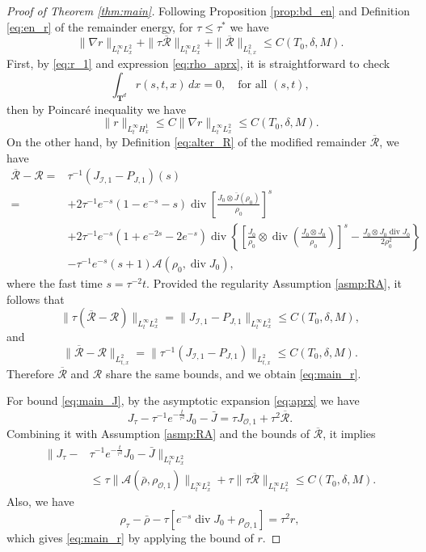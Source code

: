 \documentclass[english]{amsart}
\theoremstyle{plain}
\theoremstyle{definition}
\theoremstyle{remark}
\theoremstyle{plain}
\theoremstyle{plain}
\theoremstyle{plain}
\def\T{{\mathbf T}}%
\DeclareMathOperator{\diver}{div}
\numberwithin{equation}{section}
\begin{document}
\begin{proof}[Proof of Theorem \ref{thm:main}]
Following Proposition \ref{prop:bd_en} and Definition \eqref{eq:en_r} of the remainder energy, for $\tau\leq\tau^*$ we have
\[
\|\nabla r\|_{L^\infty_tL^2_x}+\|\tau\overline{\mathcal{R}}\|_{L^\infty_tL^2_x}+\|\overline{\mathcal{R}}\|_{L^2_{t,x}}\leq C(T_0,\delta,M).
\]
First, by \eqref{eq:r_1} and expression \eqref{eq:rho_aprx}, it is straightforward to check 
\[
\int_{\T^d} r(s,t,x)\,dx=0,\quad\textrm{for all }(s,t),
\]
then by Poincar\'e inequality we have
\[
\|r\|_{L^\infty_tH^1_x}\leq C\|\nabla r\|_{L^\infty_tL^2_x}\leq C(T_0,\delta,M).
\]
On the other hand, by Definition \eqref{eq:alter_R} of the modified remainder $\overline{\mathcal{R}}$, we have
\begin{align*}
\overline{\mathcal{R}}-\mathcal{R}=&\tau^{-1}(J_{\mathcal{I},1}-P_{J,1})(s)\\
=&+2\tau^{-1} e^{-s}(1-e^{-s}-s)\diver\left[\frac{J_0\otimes \bar J(\rho_0)}{\rho_0}\right]^s\\
&+2\tau^{-1} e^{-s}(1+e^{-2s}-2e^{-s})\diver\left\{\left[\frac{J_0}{\rho_0}\otimes\diver\left(\frac{J_0\otimes J_0}{\rho_0}\right)\right]^s-\frac{J_0\otimes J_0\diver J_0}{2\rho_0^2}\right\}\\
&-\tau^{-1} e^{-s}(s+1)\mathcal{A}(\rho_0,\diver J_0),
\end{align*}
where the fast time $s=\tau^{-2}t$. Provided the regularity Assumption \ref{asmp:RA}, it follows that
\[
\|\tau(\overline{\mathcal{R}}-\mathcal{R})\|_{L^\infty_tL^2_x}=\|J_{\mathcal{I},1}-P_{J,1}\|_{L^\infty_tL^2_x}\leq C(T_0,\delta,M),
\]
and
\[
\|\overline{\mathcal{R}}-\mathcal{R}\|_{L^2_{t,x}}=\|\tau^{-1}(J_{\mathcal{I},1}-P_{J,1})\|_{L^2_{t,x}}\leq C(T_0,\delta,M).
\]
Therefore $\overline{\mathcal{R}}$ and $\mathcal{R}$ share the same bounds, and we obtain \eqref{eq:main_r}.

For bound \eqref{eq:main_J}, by the asymptotic expansion \eqref{eq:aprx} we have
\[
J_\tau-\tau^{-1}e^{-\frac{t}{\tau^2}}J_0-\bar J=\tau J_{\mathcal{O},1}+\tau^2\overline{\mathcal{R}}.
\]
Combining it with Assumption \eqref{asmp:RA} and the bounds of $\overline{\mathcal{R}}$, it implies
\begin{align*}
\|J_\tau-&\tau^{-1}e^{-\frac{t}{\tau^2}}J_0-\bar J\|_{L^\infty_tL^2_x}\\
&\leq  \tau \|\mathcal{A}(\bar\rho,\rho_{\mathcal{O},1})\|_{L^\infty_tL^2_x}+\tau \|\tau\overline{\mathcal{R}}\|_{L^\infty_tL^2_x}
\leq  C(T_0,\delta,M).
\end{align*}
Also, we have
\[
\rho_\tau-\bar\rho-\tau [e^{-s}\diver J_0+\rho_{\mathcal{O},1}]=\tau^2 r,
\]
which gives \eqref{eq:main_r} by applying the bound of $r$.
\end{proof}
\end{document}
